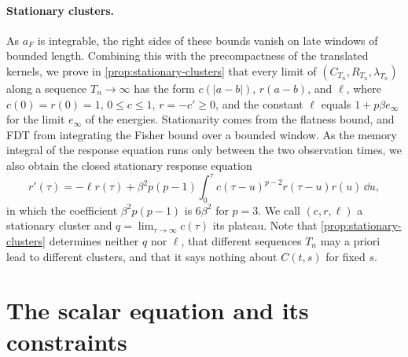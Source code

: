 \paragraph{Stationary clusters.}
As $a_F$ is integrable, the right sides of these bounds vanish on late windows of bounded length. Combining this with the precompactness of the translated kernels, we prove in \cref{prop:stationary-clusters} that every limit of $(C_{T_n},R_{T_n},\lambda_{T_n})$ along a sequence $T_n\to\infty$ has the form $c(|a-b|)$, $r(a-b)$, and $\ell$, where $c(0)=r(0)=1$, $0\le c\le1$, $r=-c'\ge0$, and the constant $\ell$ equals $1+p\beta e_\infty$ for the limit $e_\infty$ of the energies. Stationarity comes from the flatness bound, and FDT from integrating the Fisher bound over a bounded window. As the memory integral of the response equation runs only between the two observation times, we also obtain the closed stationary response equation
\begin{equation}\label{eq:overview-stationary-response}
 r'(\tau)=-\ell r(\tau)+\beta^2p(p-1)\int_0^\tau c(\tau-u)^{p-2}r(\tau-u)r(u)\,\dd u ,
\end{equation}
in which the coefficient $\beta^2p(p-1)$ is $6\beta^2$ for $p=3$. We call $(c,r,\ell)$ a stationary cluster and $q=\lim_{\tau\to\infty}c(\tau)$ its plateau. Note that \cref{prop:stationary-clusters} determines neither $q$ nor $\ell$, that different sequences $T_n$ may a priori lead to different clusters, and that it says nothing about $C(t,s)$ for fixed $s$.

\section{The scalar equation and its constraints}\label{sec:overview-scalar}


